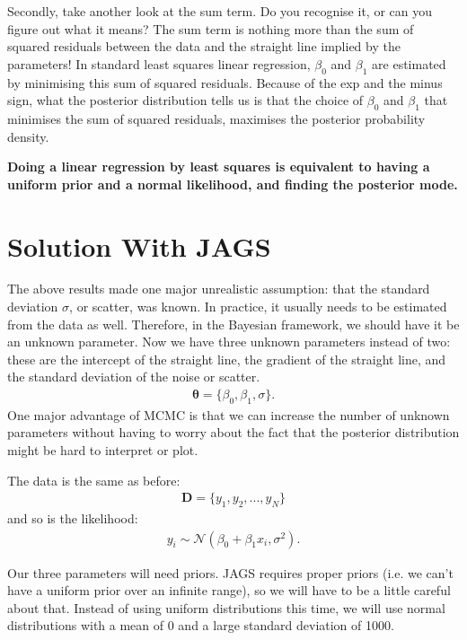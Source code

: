 Secondly, take another look at the sum term. Do you recognise it, or can you
figure out what it means? The sum term is nothing more than the sum of squared
residuals between the data and the straight line implied by the parameters!
In standard least squares linear regression, $\beta_0$ and $\beta_1$ are
estimated by minimising this sum of squared residuals. Because of the exp and
the minus sign, what the posterior distribution tells us is that the choice of
$\beta_0$ and $\beta_1$ that minimises the sum of squared residuals, maximises
the posterior probability density.

\begin{framed}
\begin{center}
{\bf Doing a linear regression by least squares is equivalent to having a
uniform prior and a normal likelihood, and finding the posterior mode.}
\end{center}
\end{framed}

\section{Solution With JAGS}
The above results made one major unrealistic assumption: that the standard
deviation $\sigma$, or scatter, was known. In practice, it usually needs to be
estimated from the data as well. Therefore, in the Bayesian framework, we should
have it be an unknown parameter. Now we have three unknown parameters instead
of two: these are the intercept of the straight line, the gradient of
the straight line, and the standard deviation of the noise or scatter.
\begin{eqnarray}
\boldsymbol{\theta} = \{\beta_0, \beta_1, \sigma\}.
\end{eqnarray}
One major advantage of MCMC is that we can increase the number of unknown parameters
without having to worry about the fact that the posterior distribution might
be hard to interpret or plot.

The data is the same as before:
\begin{eqnarray}
\boldsymbol{D} = \{y_1, y_2, ..., y_N\}
\end{eqnarray}
and so is the likelihood:
\begin{eqnarray}
y_i \sim \mathcal{N}(\beta_0 + \beta_1 x_i, \sigma^2).
\end{eqnarray}

Our three parameters will need priors. JAGS requires proper priors (i.e. we
can't have a uniform prior over an infinite range), so we will have to be a
little careful about that. Instead of using uniform distributions this time,
we will use normal distributions with a mean of 0 and a large standard deviation
of 1000.

